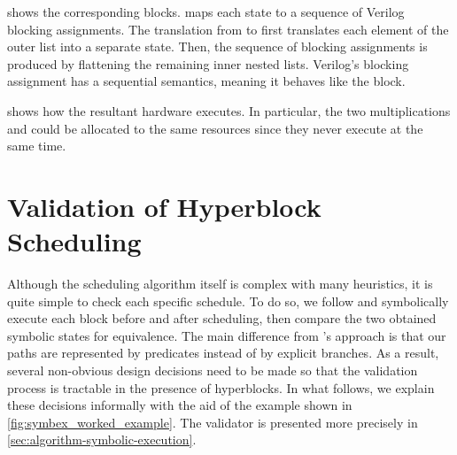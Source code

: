  shows the corresponding \htl{} blocks.  \htl{} maps each state to a sequence of Verilog blocking assignments. The translation from \rtlpar{} to \htl{} first translates each element of the outer list into a separate \htl{} state.  Then, the sequence of blocking assignments is produced by flattening the remaining inner nested lists.  Verilog's blocking assignment has a sequential semantics, meaning it behaves like the \rtlpar{} block.

 shows how the resultant hardware executes. In particular, the two multiplications \sIV{} and \sV{} could be allocated to the same resources since they never execute at the same time.

\section{Validation of Hyperblock Scheduling}
\label{sec:hs:verifying-scheduling}

Although
the scheduling algorithm itself is complex with many heuristics, it is quite simple to check each specific
schedule. To do so, we follow \textcite[]{tristan08_formal_verif_trans_valid} and symbolically execute each block before and after scheduling, then compare the two obtained symbolic states for equivalence.
The main difference from \citeauthor[]{tristan08_formal_verif_trans_valid}'s approach is that our paths are represented by predicates instead of by explicit branches. As a result, several non-obvious design decisions need
to be made so that the validation process is tractable in the presence of hyperblocks.
In what follows, we explain these decisions informally with the aid of the example shown in \cref{fig:symbex_worked_example}.  The validator is presented more precisely in
\cref{sec:algorithm-symbolic-execution}.

